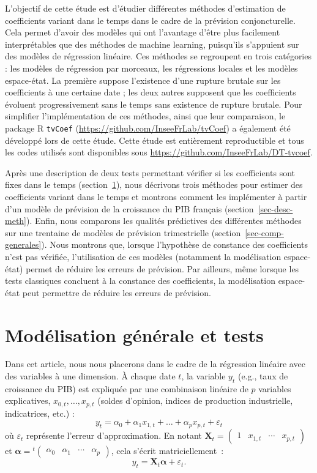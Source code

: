 \documentclass[
  a4paper,
  DIV=11,
  numbers=noendperiod,
  french]{scrartcl}
\newcommand\1{{\mathds 1}}
\newcommand{\transp}[1]{{}^t\!#1}
\newcommand{\bf}[1]{{\boldsymbol #1}}
\theoremstyle{remark}
\begin{document}
L'objectif de cette étude est d'étudier différentes méthodes
d'estimation de coefficients variant dans le temps dans le cadre de la
prévision conjoncturelle. Cela permet d'avoir des modèles qui ont
l'avantage d'être plus facilement interprétables que des méthodes de
machine learning, puisqu'ils s'appuient sur des modèles de régression
linéaire. Ces méthodes se regroupent en trois catégories : les modèles
de régression par morceaux, les régressions locales et les modèles
espace-état. La première suppose l'existence d'une rupture brutale sur
les coefficients à une certaine date ; les deux autres supposent que les
coefficients évoluent progressivement sans le temps sans existence de
rupture brutale. Pour simplifier l'implémentation de ces méthodes, ainsi
que leur comparaison, le package R \texttt{tvCoef}
(\url{https://github.com/InseeFrLab/tvCoef}) a également été développé
lors de cette étude. Cette étude est entièrement reproductible et tous
les codes utilisés sont disponibles sous
\url{https://github.com/InseeFrLab/DT-tvcoef}.

Après une description de deux tests permettant vérifier si les
coefficients sont fixes dans le temps (section~\ref{sec-tests}), nous
décrivons trois méthodes pour estimer des coefficients variant dans le
temps et montrons comment les implémenter à partir d'un modèle de
prévision de la croissance du PIB français
(section~\ref{sec-desc-meth}). Enfin, nous comparons les qualités
prédictives des différentes méthodes sur une trentaine de modèles de
prévision trimestrielle (section~\ref{sec-comp-generales}). Nous
montrons que, lorsque l'hypothèse de constance des coefficients n'est
pas vérifiée, l'utilisation de ces modèles (notamment la modélisation
espace-état) permet de réduire les erreurs de prévision. Par ailleurs,
même lorsque les tests classiques concluent à la constance des
coefficients, la modélisation espace-état peut permettre de réduire les
erreurs de prévision.

\section{Modélisation générale et tests}\label{sec-tests}

Dans cet article, nous nous placerons dans le cadre de la régression
linéaire avec des variables à une dimension. À chaque date \(t\), la
variable \(y_t\) (e.g., taux de croissance du PIB) est expliquée par une
combinaison linéaire de \(p\) variables explicatives,
\(x_{0,t},\dots,x_{p,t}\) (soldes d'opinion, indices de production
industrielle, indicatrices, etc.) : \[
y_t=\alpha_{0}+\alpha_{1} x_{1,t}+\dots+\alpha_{p} x_{p,t} +\varepsilon_t 
\] où \(\varepsilon_t\) représente l'erreur d'approximation. En notant
\({\bf X}_t=\begin{pmatrix}1 & x_{1,t} &\cdots & x_{p,t} \end{pmatrix}\)
et
\({\bf \alpha}=\transp{\begin{pmatrix}\alpha_0 & \alpha_1 &\cdots & \alpha_p \end{pmatrix}}\),
cela s'écrit matriciellement~: \[
y_t={\bf X_t} \bf\alpha +\varepsilon_t.
\]
\end{document}
